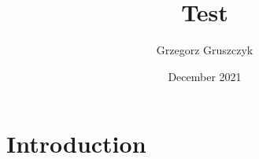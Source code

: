 \documentclass{article}
\title{Test}
\author{Grzegorz Gruszczyk}
\date{December 2021}
\begin{document}
\maketitle

\section{Introduction}
\end{document}
